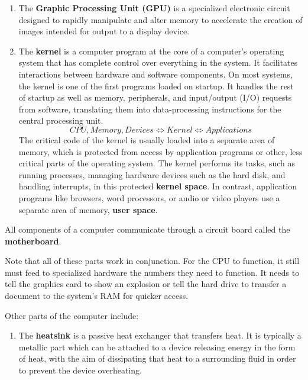 \documentclass{article}
\begin{document}
\begin{definition}
\begin{enumerate}
      \item The \textbf{Graphic Processing Unit (GPU)} is a specialized electronic circuit designed to rapidly manipulate and alter memory to accelerate the creation of images intended for output to a display device. 
      
      \item The \textbf{kernel} is a computer program at the core of a computer's operating system that has complete control over everything in the system. It facilitates interactions between hardware and software components. On most systems, the kernel is one of the first programs loaded on startup. It handles the rest of startup as well as memory, peripherals, and input/output (I/O) requests from software, translating them into data-processing instructions for the central processing unit.
      \[CPU, Memory, Devices \iff Kernel \iff Applications\]
      The critical code of the kernel is usually loaded into a separate area of memory, which is protected from access by application programs or other, less critical parts of the operating system. The kernel performs its tasks, such as running processes, managing hardware devices such as the hard disk, and handling interrupts, in this protected \textbf{kernel space}. In contrast, application programs like browsers, word processors, or audio or video players use a separate area of memory, \textbf{user space}. 
  \end{enumerate}
  All components of a computer communicate through a circuit board called the \textbf{motherboard}. 
  \end{definition}

  Note that all of these parts work in conjunction. For the CPU to function, it still must feed to specialized hardware the numbers they need to function. It needs to tell the graphics card to show an explosion or tell the hard drive to transfer a document to the system’s RAM for quicker access.

  \begin{definition}
  Other parts of the computer include: 
  \begin{enumerate}
      \item The \textbf{heatsink} is a passive heat exchanger that transfers heat. It is typically a metallic part which can be attached to a device releasing energy in the form of heat, with the aim of dissipating that heat to a surrounding fluid in order to prevent the device overheating. 
  \end{enumerate}
  \end{definition}
\end{document}
